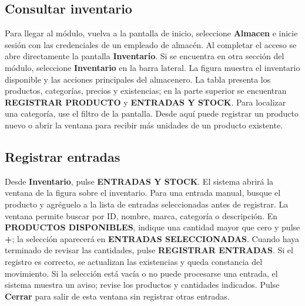 \documentclass[12pt,a4paper]{article}
\begin{document}
\subsection{Consultar inventario}
Para llegar al módulo, vuelva a la pantalla de inicio, seleccione \textbf{Almacen} e inicie sesión con las credenciales de un empleado de almacén. Al completar el acceso se abre directamente la pantalla \textbf{Inventario}. Si se encuentra en otra sección del módulo, seleccione \textbf{Inventario} en la barra lateral.
La figura muestra el inventario disponible y las acciones principales del almacenero. La tabla presenta los productos, categorías, precios y existencias; en la parte superior se encuentran \textbf{REGISTRAR PRODUCTO} y \textbf{ENTRADAS Y STOCK}. Para localizar una categoría, use el filtro de la pantalla. Desde aquí puede registrar un producto nuevo o abrir la ventana para recibir más unidades de un producto existente.

\subsection{Registrar entradas}
Desde \textbf{Inventario}, pulse \textbf{ENTRADAS Y STOCK}. El sistema abrirá la ventana de la figura sobre el inventario. Para una entrada manual, busque el producto y agréguelo a la lista de entradas seleccionadas antes de registrar.
La ventana permite buscar por ID, nombre, marca, categoría o descripción. En \textbf{PRODUCTOS DISPONIBLES}, indique una cantidad mayor que cero y pulse \textbf{+}; la selección aparecerá en \textbf{ENTRADAS SELECCIONADAS}. Cuando haya terminado de revisar las cantidades, pulse \textbf{REGISTRAR ENTRADAS}. Si el registro es correcto, se actualizan las existencias y queda constancia del movimiento. Si la selección está vacía o no puede procesarse una entrada, el sistema muestra un aviso; revise los productos y cantidades indicados. Pulse \textbf{Cerrar} para salir de esta ventana sin registrar otras entradas.
\end{document}
